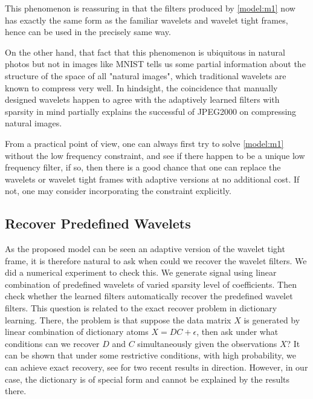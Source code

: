 \documentclass[a4paper]{article}
\begin{document}
This phenomenon is reassuring in that the filters produced by \eqref{model:m1} now has exactly the same form as the familiar wavelets and wavelet tight frames, hence can be used in the precisely same way.

On the other hand, that fact that this phenomenon is ubiquitous in natural photos but not in images like MNIST tells us some partial information about the structure of the space of all "natural images", which traditional wavelets are known to compress very well. In hindsight, the coincidence that manually designed wavelets happen to agree with the adaptively learned filters with sparsity in mind partially explains the successful of JPEG2000 on compressing natural images.

From a practical point of view, one can always first try to solve \eqref{model:m1} without the low frequency constraint, and see if there happen to be a unique low frequency filter, if so, then there is a good chance that one can replace the wavelets or wavelet tight frames with adaptive versions at no additional cost. If not, one may consider incorporating the constraint explicitly.

\subsection{Recover Predefined Wavelets}
As the proposed model can be seen an adaptive version of the wavelet tight frame, it is therefore natural to ask when could we recover the wavelet filters. We did a numerical experiment to check this. We generate signal using linear combination of predefined wavelets of varied sparsity level of coefficients.  Then check whether the learned filters automatically recover the predefined wavelet filters. This question is related to the exact recover problem in dictionary learning. There, the problem is that suppose the data matrix $X$ is generated by linear combination of dictionary atoms $X=DC+\epsilon$, then ask under what conditions can we recover $D$ and $C$ simultaneously given the observations $X$? It can be shown that under some restrictive conditions, with high probability, we can achieve exact recovery, see \cite{spielman2013exact,arora2013new} for two recent results in direction. However, in our case, the dictionary is of special form and cannot be explained by the results there.
\end{document}
